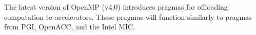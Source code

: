 \documentclass{report}
\begin{document}
The latest version of OpenMP (v4.0) introduces pragmas for offloading computation to accelerators. These pragmas will function similarly to pragmas from PGI, OpenACC, and the Intel MIC. 


%
%





\ifstandalone


\end{document}
